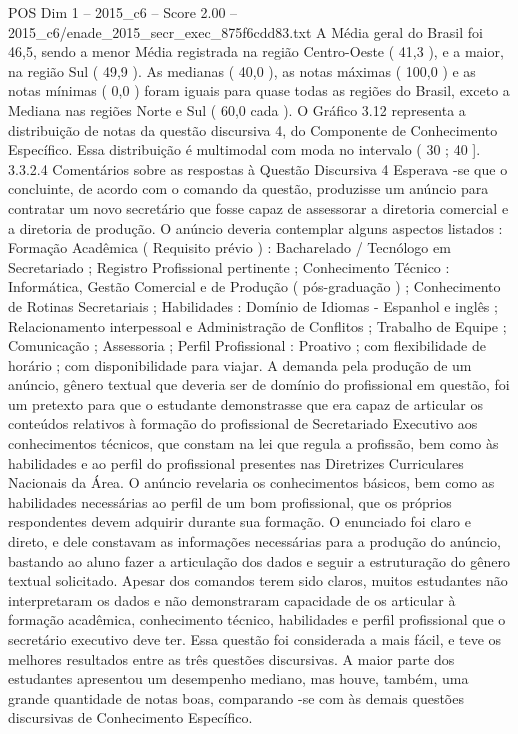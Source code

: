 \begin{textsample}{POS Dim 1 – 2015\_c6 – Score 2.00 – 2015\_c6/enade\_2015\_secr\_exec\_875f6cdd83.txt}
A Média geral do Brasil foi 46,5, sendo a menor Média registrada na região Centro-Oeste ( 41,3 ), e a maior, na região Sul ( 49,9 ).
As medianas ( 40,0 ), as notas máximas ( 100,0 ) e as notas mínimas ( 0,0 ) foram iguais para quase todas as regiões do Brasil, exceto a Mediana nas regiões Norte e Sul ( 60,0 cada ).
O Gráfico 3.12 representa a distribuição de notas da questão discursiva 4, do Componente de Conhecimento Específico.
Essa distribuição é multimodal com moda no intervalo ( 30 ; 40 ]. 3.3.2.4 Comentários sobre as respostas à Questão Discursiva 4 Esperava -se que o concluinte, de acordo com o comando da questão, produzisse um anúncio para contratar um novo secretário que fosse capaz de assessorar a diretoria comercial e a diretoria de produção.
O anúncio deveria contemplar alguns aspectos listados : Formação Acadêmica ( Requisito prévio ) : Bacharelado / Tecnólogo em Secretariado ; Registro Profissional pertinente ; Conhecimento Técnico : Informática, Gestão Comercial e de Produção ( pós-graduação ) ; Conhecimento de Rotinas Secretariais ; Habilidades : Domínio de Idiomas - Espanhol e inglês ; Relacionamento interpessoal e Administração de Conflitos ; Trabalho de Equipe ; Comunicação ; Assessoria ; Perfil Profissional : Proativo ; com flexibilidade de horário ; com disponibilidade para viajar.
A demanda pela produção de um anúncio, gênero textual que deveria ser de domínio do profissional em questão, foi um pretexto para que o estudante demonstrasse que era capaz de articular os conteúdos relativos à formação do profissional de Secretariado Executivo aos conhecimentos técnicos, que constam na lei que regula a profissão, bem como às habilidades e ao perfil do profissional presentes nas Diretrizes Curriculares Nacionais da Área.
O anúncio revelaria os conhecimentos básicos, bem como as habilidades necessárias ao perfil de um bom profissional, que os próprios respondentes devem adquirir durante sua formação.
O enunciado foi claro e direto, e dele constavam as informações necessárias para a produção do anúncio, bastando ao aluno fazer a articulação dos dados e seguir a estruturação do gênero textual solicitado.
Apesar dos comandos terem sido claros, muitos estudantes não interpretaram os dados e não demonstraram capacidade de os articular à formação acadêmica, conhecimento técnico, habilidades e perfil profissional que o secretário executivo deve ter.
Essa questão foi considerada a mais fácil, e teve os melhores resultados entre as três questões discursivas.
A maior parte dos estudantes apresentou um desempenho mediano, mas houve, também, uma grande quantidade de notas boas, comparando -se com às demais questões discursivas de Conhecimento Específico.

\end{textsample}
